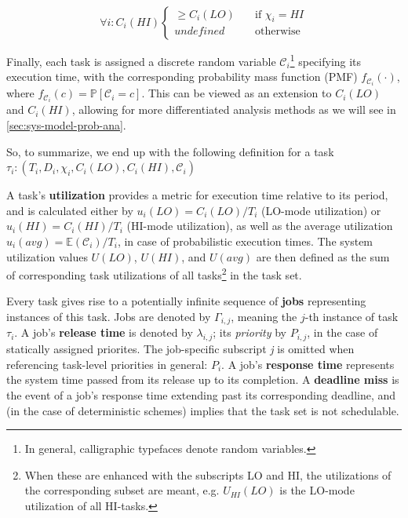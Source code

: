 \documentclass[a4paper,oneside]{csthesis}
\begin{document}
\begin{equation*}
    \forall i: C_i(HI)
    \begin{cases}
        \geq C_i(LO) & \quad \text{if } \chi_i = HI\\
        \textit{undefined} & \quad \text{otherwise}
    \end{cases}
\end{equation*}

Finally, each task is assigned a discrete random variable $\mathcal{C}_i$\footnote{In general, calligraphic typefaces denote random variables.} specifying its execution time, with the corresponding probability mass function (PMF) $f_{\mathcal{C}_i}(\cdot)$, where $f_{\mathcal{C}_i}(c) = \mathbb{P}[\mathcal{C}_i = c]$. This can be viewed as an extension to $C_i(LO)$ and $C_i(HI)$, allowing for more differentiated analysis methods as we will see in \cref{sec:sys-model-prob-ana}.

So, to summarize, we end up with the following definition for a task $\tau_i : (T_i, D_i, \chi_i, C_i(LO), C_i(HI), \mathcal{C}_i)$

A task's \textbf{utilization} provides a metric for execution time relative to its period, and is calculated either by $u_i(LO) = C_i(LO) / T_i$ (LO-mode utilization) or $u_i(HI) = C_i(HI) / T_i$ (HI-mode utilization), as well as the average utilization $u_i(avg) = \mathbb{E}(\mathcal{C}_i) / T_i$, in case of probabilistic execution times. The system utilization values $U(LO)$, $U(HI)$, and $U(avg)$ are then defined as the sum of corresponding task utilizations of all tasks\footnote{When these are enhanced with the subscripts LO and HI, the utilizations of the corresponding subset are meant, e.g. $U_{HI}(LO)$ is the LO-mode utilization of all HI-tasks.} in the task set.

Every task gives rise to a potentially infinite sequence of \textbf{jobs} representing instances of this task. Jobs are denoted by $\Gamma_{i,j}$, meaning the $j$-th instance of task $\tau_i$. A job's \textbf{release time} is denoted by $\lambda_{i,j}$; its \textit{priority} by $P_{i,j}$, in the case of statically assigned priorites. The job-specific subscript \textit{j} is omitted when referencing task-level priorities in general: $P_i$. A job's \textbf{response time} represents the system time passed from its release up to its completion. A \textbf{deadline miss} is the event of a job's response time extending past its corresponding deadline, and (in the case of deterministic schemes) implies that the task set is not schedulable.
\end{document}
